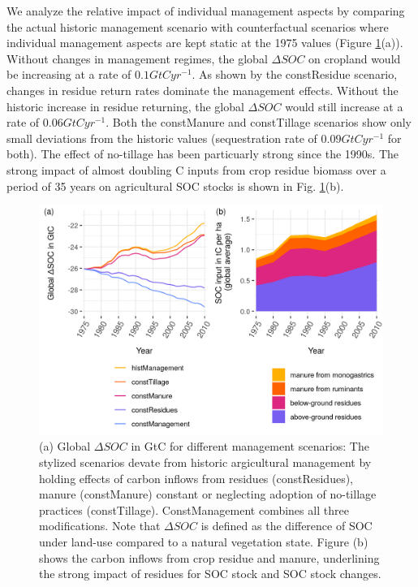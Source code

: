 \documentclass[gc, manuscript]{copernicus}
\begin{document}
We analyze the relative impact of individual management aspects by comparing the actual historic management scenario with counterfactual scenarios where individual management aspects are kept static at the 1975 values (Figure \ref{fig:SOCscen}(a)). Without changes in management regimes, the global \(\Delta SOC\) on cropland would be increasing at a rate of \(0.1\unit{GtC yr^{-1}}\). As shown by the constResidue scenario, changes in residue return rates dominate the management effects. Without the historic increase in residue returning, the global \(\Delta SOC\) would still increase at a rate of \(0.06\unit{GtC yr^{-1}}\). Both the constManure and constTillage scenarios show only small deviations from the historic values (sequestration rate of \(0.09\unit{GtC yr^{-1}}\) for both). The effect of no-tillage has been particuarly strong since the 1990s.
The strong impact of almost doubling C inputs from crop residue biomass over a period of 35 years on agricultural SOC stocks is shown in Fig. \ref{fig:SOCscen}(b).

\begin{figure}
\includegraphics[width=14cm]{../ResultNotebooks/Output/Images/scenario_horiz} \caption{(a) Global $\Delta SOC$ in GtC for different management scenarios: The stylized scenarios devate from historic argicultural management by holding effects of carbon inflows from residues (constResidues), manure (constManure) constant or neglecting adoption of no-tillage practices (constTillage). ConstManagement combines all three modifications. Note that $\Delta SOC$ is defined as the difference of SOC under land-use compared to a natural vegetation state. Figure (b) shows the carbon inflows from crop residue and manure, underlining the strong impact of residues for SOC stock and SOC stock changes.}\label{fig:SOCscen}
\end{figure}
\end{document}
